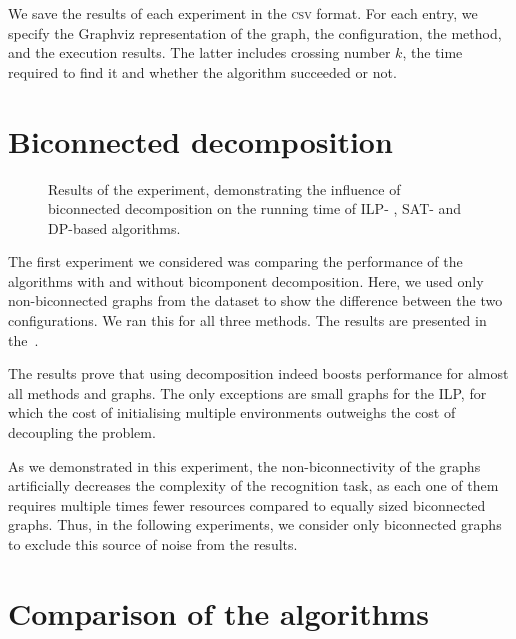 We save the results of each experiment in the \textsc{csv} format. For each entry, we specify the Graphviz representation of the graph, the configuration, the method, and the execution results. The latter includes crossing number \(k\), the time required to find it and whether the algorithm succeeded or not.


\section{Biconnected decomposition}

\begin{figure}[tbh]
    \centering
     \hfill
     \hfill
    \caption{Results of the experiment, demonstrating the influence of biconnected decomposition on the running time of ILP- , SAT- and DP-based algorithms.}
    \label{fig:bctree-results}
\end{figure}

The first experiment we considered was comparing the performance of the algorithms with and without bicomponent decomposition. Here, we used only non-biconnected graphs from the dataset to show the difference between the two configurations. We ran this for all three methods. The results are presented in the~.

The results prove that using decomposition indeed boosts performance for almost all methods and graphs. The only exceptions are small graphs for the \textsf{ILP}, for which the cost of initialising multiple environments outweighs the cost of decoupling the problem.

As we demonstrated in this experiment, the non-biconnectivity of the graphs artificially decreases the complexity of the recognition task, as each one of them requires multiple times fewer resources compared to equally sized biconnected graphs. Thus, in the following experiments, we consider only biconnected graphs to exclude this source of noise from the results.


\section{Comparison of the algorithms}

